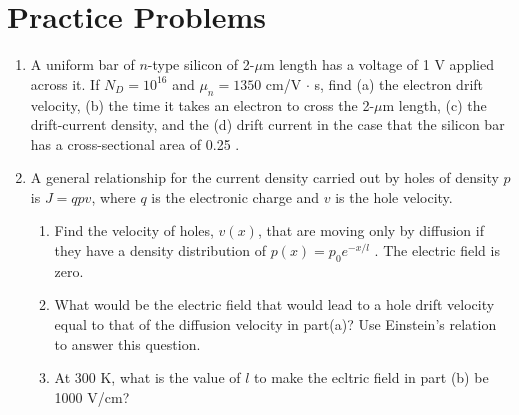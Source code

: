 \section{Practice Problems}
\begin{enumerate}
    \item A uniform bar of $n$-type silicon of 2-$\mu$m length has a voltage of 1 V applied across it. If $N_D = 10^{16}$ \conc and $\mu_n = 1350$ cm\sq/V $\cdot$ s, find (a) the electron drift velocity, (b) the time it takes an electron to cross the 2-$\mu$m length, (c) the drift-current density, and the (d) drift current in the case that the silicon bar has a cross-sectional area of 0.25 \mun\sq.
    \begin{Ans}
    \end{Ans}

    \item A general relationship for the current density carried out by holes of density $p$ is $J = qpv$, where $q$ is the electronic charge and $v$ is the hole velocity.
    \begin{enumerate}
        \item Find the velocity of holes, $v(x)$, that are moving only by diffusion if they have a density distribution of $p(x) = p_0 e^{-x/l}$ . The electric field is zero.
        \item What would be the electric field that would lead to a hole drift velocity equal to that of the diffusion velocity in part(a)? Use Einstein's relation to answer this question.
        \item At 300 K, what is the value of $l$ to make the ecltric field in part (b) be 1000 V/cm?
    \end{enumerate}
\end{enumerate}